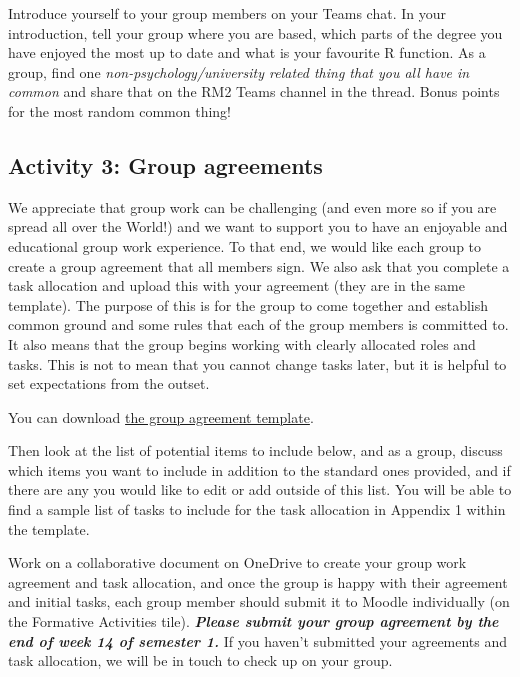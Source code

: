 \documentclass[
  english,
  letterpaper,
  DIV=11,
  numbers=noendperiod]{scrreprt}
\begin{document}
Introduce yourself to your group members on your Teams chat. In your
introduction, tell your group where you are based, which parts of the
degree you have enjoyed the most up to date and what is your favourite R
function. As a group, find one \emph{non-psychology/university related
thing that you all have in common} and share that on the RM2 Teams
channel in the thread. Bonus points for the most random common thing!

\subsection{Activity 3: Group
agreements}\label{activity-3-group-agreements}

We appreciate that group work can be challenging (and even more so if
you are spread all over the World!) and we want to support you to have
an enjoyable and educational group work experience. To that end, we
would like each group to create a group agreement that all members sign.
We also ask that you complete a task allocation and upload this with
your agreement (they are in the same template). The purpose of this is
for the group to come together and establish common ground and some
rules that each of the group members is committed to. It also means that
the group begins working with clearly allocated roles and tasks. This is
not to mean that you cannot change tasks later, but it is helpful to set
expectations from the outset.

You can download
\href{https://gla-my.sharepoint.com/:w:/g/personal/ashley_robertson_glasgow_ac_uk/EcRHw5yd3v1JmFwm1drRu-MB33Im0__d6jRPqKbdnjjDzg?e=s7wEoU}{the
group agreement template}.

Then look at the list of potential items to include below, and as a
group, discuss which items you want to include in addition to the
standard ones provided, and if there are any you would like to edit or
add outside of this list. You will be able to find a sample list of
tasks to include for the task allocation in Appendix 1 within the
template.

Work on a collaborative document on OneDrive to create your group work
agreement and task allocation, and once the group is happy with their
agreement and initial tasks, each group member should submit it to
Moodle individually (on the Formative Activities tile).
\textbf{\emph{Please submit your group agreement by the end of week 14
of semester 1.}} If you haven't submitted your agreements and task
allocation, we will be in touch to check up on your group.
\end{document}

